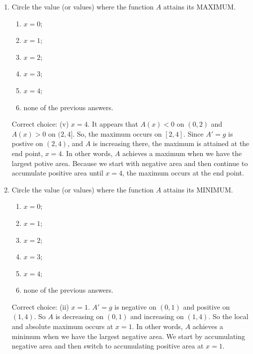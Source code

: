 \documentclass[nooutcomes,handout]{ximera}
\begin{document}
\begin{problem}
\begin{enumerate}
    \item
      Circle the value (or values) where the function $A$ attains its MAXIMUM.
      \begin{enumerate}
        \item $x = 0$;
        \item $x = 1$;
        \item $x = 2$;
        \item $x = 3$;
        \item $x = 4$;
        \item none of the previous answers.
      \end{enumerate}
      \begin{freeResponse}
        Correct choice: (v) $x = 4$.  It appears that $A(x)<0$ on $(0,2)$ and $A(x)>0$ on $(2,4]$.  So, the maximum occurs on $[2,4]$.  Since $A'=g$ is postive on $(2,4)$, and $A$ is increasing there, the maximum is attained at the end point, $x=4$.  In other words, $A$ achieves a maximum when we have the largest potive area.  Because we start with negative area and then continue to accumulate positive area until $x=4$, the maximum occurs at the end point.
      \end{freeResponse}

    \item
      Circle the value  (or values) where the function $A$ attains its MINIMUM.
      \begin{enumerate}
        \item $x = 0$;
        \item $x = 1$;
        \item $x = 2$;
        \item $x = 3$;
        \item $x = 4$;
        \item none of the previous answers.
      \end{enumerate}
      \begin{freeResponse}
        Correct choice: (ii) $x = 1$.  $A'=g$ is negative on $(0,1)$ and positive on $(1,4)$.  So $A$ is decreasing on $(0,1)$ and increasing on $(1,4)$.  So the local and absolute maximum occurs at $x=1$.  In other words, $A$ achieves a minimum when we have the largest negative area.  We start by accumulating negative area and then switch to accumulating positive area at $x=1$.
      \end{freeResponse}


\end{enumerate}
\end{problem}
\end{document}
